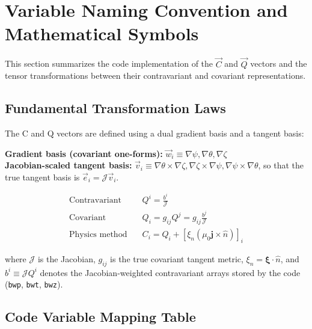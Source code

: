 \documentclass[10pt,a4paper]{article}
\numberwithin{equation}{section}
\begin{document}
\section{Variable Naming Convention and Mathematical Symbols}
\label{sec:naming}

This section summarizes the code implementation of the $\vec C$ and $\vec Q$ vectors and the tensor transformations between their contravariant and covariant representations.

\subsection{Fundamental Transformation Laws}

The C and Q vectors are defined using a dual gradient basis and a tangent basis:

\textbf{Gradient basis (covariant one-forms):}
$\vec{w}_i \equiv \nabla \psi, \nabla \theta, \nabla \zeta$ \\
\textbf{Jacobian-scaled tangent basis:}
$\vec{v}_i \equiv \nabla \theta \times \nabla \zeta, \nabla \zeta \times \nabla \psi, \nabla \psi \times \nabla \theta$,
so that the true tangent basis is \(\vec e_i=\mathcal J\vec v_i\).

\begin{equation}
\boxed{
\begin{aligned}
\text{Contravariant} \quad &Q^i = \frac{b^i}{\mathcal{J}} \\
\text{Covariant} \quad &Q_i = g_{ij} Q^j = g_{ij} \frac{b^j}{\mathcal{J}} \\
\text{Physics method} \quad &C_i = Q_i + \left[\xi_n(\mu_0 \mathbf{j} \times \hat{n})\right]_i
\end{aligned}
}
\end{equation}

where $\mathcal{J}$ is the Jacobian, \(g_{ij}\) is the true covariant tangent
metric, \(\xi_n=\boldsymbol\xi\cdot\hat n\), and \(b^i\equiv\mathcal J Q^i\)
denotes the Jacobian-weighted contravariant arrays stored by the code
(\texttt{bwp}, \texttt{bwt}, \texttt{bwz}).
\subsection{Code Variable Mapping Table}
\end{document}
